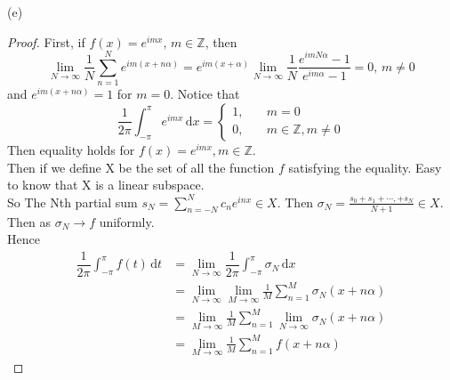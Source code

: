 \documentclass{article}
\begin{document}
(e)\begin{proof}
    First, if  $ f(x)=e^{imx},\,m\in\mathbb{Z} $, then
    \[
        \lim\limits_{N\to\infty}\frac{1}{N }\sum\limits_{n=1 }^{N}e^{im(x+n\alpha)}=e^{im(x+\alpha)}\lim\limits_{N\to\infty}\frac{1}{N }\frac{e^{imN\alpha}-1}{e^{im\alpha}-1}=0,\,m\not=0
    \]
    and  $ e^{im(x+n\alpha)}=1 $ for  $ m=0 $.
    Notice that 
    \begin{equation*}
        \frac{1}{2\pi}\int_{-\pi }^{\pi } e^{imx}\, \mathrm{d}x=\left\{
            \begin{aligned}
                1,&\quad m=0\\
                0,&\quad m\in \mathbb{Z },m\not=0
            \end{aligned}
        \right.  
    \end{equation*}  
    Then equality holds for  $ f(x)=e^{imx},m\in\mathbb{Z} $.\\
    Then if we define X be the set of all the function  $ f $ satisfying the equality.
    Easy to know that X is a linear subspace.\\
    So The Nth partial sum  $ s_N=\sum\limits_{n=-N }^{N } c_ne^{inx}\in X $.
    Then  $ \sigma_N=\frac{s_0+s_1+\cdots,+s_N }{N+1}\in X $.\\  
    Then as  $ \sigma_N\rightarrow f $ uniformly.\\
    Hence 
    \begin{align*}
        \dfrac{1}{2\pi}\int_{-\pi}^{\pi } f(t)\, \mathrm{d}t&=\lim\limits_{N\to\infty}\dfrac{1 }{2\pi}\int_{-\pi}^{\pi} \sigma_N\, \mathrm{d}x  \\    
        &=\lim\limits_{N\to\infty} \lim\limits_{M\to\infty}\frac{1}{M }\sum\limits_{n=1 }^{M}\sigma_N(x+n\alpha)\\
        &=\lim\limits_{M\to\infty} \frac{1 }{M}\sum\limits_{n=1}^{M} \lim\limits_{N\to\infty} \sigma_N(x+n\alpha)\\
        &=\lim\limits_{M\to\infty}\frac{1}{M }\sum\limits_{n=1 }^{M}f(x+n\alpha)     
    \end{align*}
\end{proof}
\end{document}

